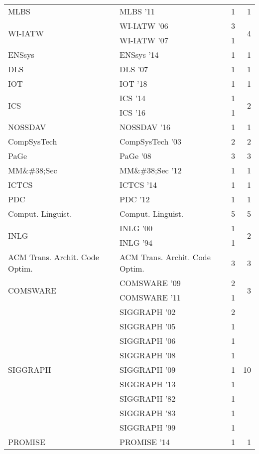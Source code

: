 \begin{table*}[t]
\begin{tabular}{llrr}
\multirow{1}{*}{MLBS } & MLBS '11 & 1 & \multirow{1}{*}{1}\\
\multirow{2}{*}{WI-IATW } & WI-IATW '06 & 3 & \multirow{2}{*}{4}\\
& WI-IATW '07 & 1 &\\
\multirow{1}{*}{ENSsys } & ENSsys '14 & 1 & \multirow{1}{*}{1}\\
\multirow{1}{*}{DLS } & DLS '07 & 1 & \multirow{1}{*}{1}\\
\multirow{1}{*}{IOT } & IOT '18 & 1 & \multirow{1}{*}{1}\\
\multirow{2}{*}{ICS } & ICS '14 & 1 & \multirow{2}{*}{2}\\
& ICS '16 & 1 &\\
\multirow{1}{*}{NOSSDAV } & NOSSDAV '16 & 1 & \multirow{1}{*}{1}\\
\multirow{1}{*}{CompSysTech } & CompSysTech '03 & 2 & \multirow{1}{*}{2}\\
\multirow{1}{*}{PaGe } & PaGe '08 & 3 & \multirow{1}{*}{3}\\
\multirow{1}{*}{MM\&\#38;Sec } & MM\&\#38;Sec '12 & 1 & \multirow{1}{*}{1}\\
\multirow{1}{*}{ICTCS } & ICTCS '14 & 1 & \multirow{1}{*}{1}\\
\multirow{1}{*}{PDC } & PDC '12 & 1 & \multirow{1}{*}{1}\\
\multirow{1}{*}{Comput. Linguist.} & Comput. Linguist. & 5 & \multirow{1}{*}{5}\\
\multirow{2}{*}{INLG } & INLG '00 & 1 & \multirow{2}{*}{2}\\
& INLG '94 & 1 &\\
\multirow{1}{*}{ACM Trans. Archit. Code Optim.} & ACM Trans. Archit. Code Optim. & 3 & \multirow{1}{*}{3}\\
\multirow{2}{*}{COMSWARE } & COMSWARE '09 & 2 & \multirow{2}{*}{3}\\
& COMSWARE '11 & 1 &\\
\multirow{9}{*}{SIGGRAPH } & SIGGRAPH '02 & 2 & \multirow{9}{*}{10}\\
& SIGGRAPH '05 & 1 &\\
& SIGGRAPH '06 & 1 &\\
& SIGGRAPH '08 & 1 &\\
& SIGGRAPH '09 & 1 &\\
& SIGGRAPH '13 & 1 &\\
& SIGGRAPH '82 & 1 &\\
& SIGGRAPH '83 & 1 &\\
& SIGGRAPH '99 & 1 &\\
\multirow{1}{*}{PROMISE } & PROMISE '14 & 1 & \multirow{1}{*}{1}\\

\end{tabular}
\end{table*}

